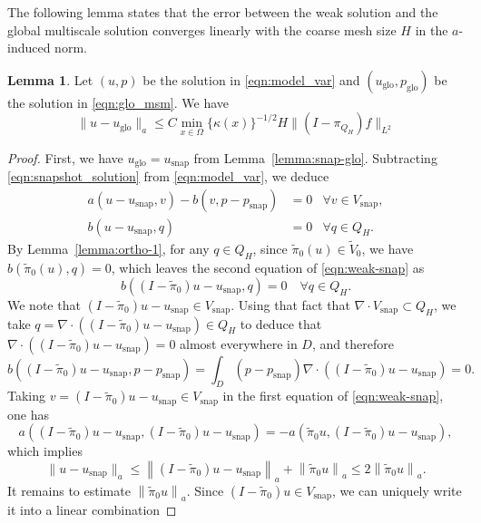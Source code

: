 \documentclass{article}[11pt]
\theoremstyle{definition}
\newtheorem{lemma}{Lemma}[section]
\begin{document}
The following lemma states that the error between 
the weak solution and the global multiscale solution 
converges linearly with the coarse mesh size $H$ 
in the $a$-induced norm. 
\begin{lemma}\label{lemma:weak-glo}
Let $(u,p)$ be the solution in \eqref{eqn:model_var} and 
$(u_{\text{glo}},p_{\text{glo}})$ be the solution in \eqref{eqn:glo_msm}. We have
\[
\|u-u_{\text{glo}}\|_{a}\leq C\min_{x\in\Omega}\{\kappa(x)\}^{-1/2}H\|(I - \pi_{Q_H}) f\|_{L^{2}}
\]
\begin{proof}
First, we have $u_{\text{glo}} = u_{\text{snap}}$ from Lemma~\ref{lemma:snap-glo}. 
Subtracting \eqref{eqn:snapshot_solution} from \eqref{eqn:model_var}, we deduce 
\begin{equation}
\label{eqn:weak-snap}
\begin{aligned}
a(u-u_{\text{snap}},v) -b(v,p-p_{\text{snap}}) & = 0 & \forall v\in V_{\text{snap}}, \\
b(u-u_{\text{snap}},q) & =0 & \forall q\in Q_{H}.
\end{aligned}
\end{equation}
By Lemma~\ref{lemma:ortho-1}, for any $q \in Q_H$, since $\tilde{\pi}_0(u) \in \tilde{V}_0$, we have $b(\tilde{\pi}_0(u), q) = 0$, which leaves the second equation of \eqref{eqn:weak-snap} as 
\[
b((I-\tilde{\pi}_0)u-u_{\text{snap}}, q) = 0 \quad \forall q\in Q_{H}.
\]
We note that $(I-\tilde{\pi}_0)u-u_{\text{snap}} \in V_{\text{snap}}$. 
Using that fact that $\nabla \cdot V_{\text{snap}} \subset Q_H$, we take 
$q = \nabla \cdot ((I-\tilde{\pi}_0)u-u_{\text{snap}}) \in Q_H$ to deduce that 
$\nabla \cdot \left((I-\tilde{\pi}_0)u-u_{\text{snap}}\right)= 0$ almost everywhere in $D$, 
and therefore 
\[
b((I-\tilde{\pi}_0)u-u_{\text{snap}}, p - p_{\text{snap}}) 
= \int_{D} (p - p_{\text{snap}}) \nabla \cdot \left((I-\tilde{\pi}_0)u-u_{\text{snap}}\right) = 0.
\]
Taking $v = (I-\tilde{\pi}_0)u-u_{\text{snap}} \in V_{\text{snap}}$ in the 
first equation of \eqref{eqn:weak-snap}, one has 
\[
a\left((I-\tilde{\pi}_0)u-u_{\text{snap}}, (I-\tilde{\pi}_0)u-u_{\text{snap}}\right) 
= -a\left(\tilde{\pi}_0 u,(I-\tilde{\pi}_0)u-u_{\text{snap}}\right), 
\]
which implies 
\begin{equation}\label{eqn:main-stab}
\| u-u_{\text{snap}} \|_a \leq \left\| (I-\tilde{\pi}_0)u-u_{\text{snap}} \right\|_a + \left\| \tilde{\pi}_0 u \right\|_a \leq 2\left\| \tilde{\pi}_0 u \right\|_a.
\end{equation}
It remains to estimate $\left\| \tilde{\pi}_0 u \right\|_a$. 
Since $(I-\tilde{\pi}_0)u \in V_{\text{snap}}$, we can uniquely write it into a linear combination 

\end{proof}
\end{lemma}
\end{document}
